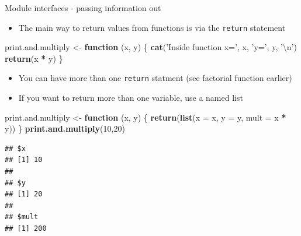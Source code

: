 \documentclass[ignorenonframetext,]{beamer}
\newenvironment{Shaded}{\begin{snugshade}}{\end{snugshade}}
\newcommand{\KeywordTok}[1]{\textcolor[rgb]{0.13,0.29,0.53}{\textbf{#1}}}
\newcommand{\DataTypeTok}[1]{\textcolor[rgb]{0.13,0.29,0.53}{#1}}
\newcommand{\DecValTok}[1]{\textcolor[rgb]{0.00,0.00,0.81}{#1}}
\newcommand{\CharTok}[1]{\textcolor[rgb]{0.31,0.60,0.02}{#1}}
\newcommand{\StringTok}[1]{\textcolor[rgb]{0.31,0.60,0.02}{#1}}
\newcommand{\ControlFlowTok}[1]{\textcolor[rgb]{0.13,0.29,0.53}{\textbf{#1}}}
\newcommand{\OperatorTok}[1]{\textcolor[rgb]{0.81,0.36,0.00}{\textbf{#1}}}
\newcommand{\NormalTok}[1]{#1}
\providecommand{\tightlist}{%
  \setlength{\itemsep}{0pt}\setlength{\parskip}{0pt}}
\begin{document}
\begin{frame}[fragile]{Module interfaces - passing information out}

\begin{itemize}[<+->]
\tightlist
\item
  The main way to return values from functions is via the
  \texttt{return} statement
\end{itemize}

\begin{Shaded}
\begin{Highlighting}[]
\NormalTok{print.and.multiply <-}\StringTok{ }\ControlFlowTok{function}\NormalTok{ (x, y) \{}
    \KeywordTok{cat}\NormalTok{(}\StringTok{'Inside function x='}\NormalTok{, x, }\StringTok{'y='}\NormalTok{, y, }\StringTok{'}\CharTok{\textbackslash{}n}\StringTok{'}\NormalTok{)}
    \KeywordTok{return}\NormalTok{(x }\OperatorTok{*}\StringTok{ }\NormalTok{y)}
\NormalTok{\}}
\end{Highlighting}
\end{Shaded}

\begin{itemize}[<+->]
\tightlist
\item
  You can have more than one \texttt{return} statment (see factorial
  function earlier)
\end{itemize}

\end{frame}

\begin{frame}[fragile]

\begin{itemize}[<+->]
\tightlist
\item
  If you want to return more than one variable, use a named list
\end{itemize}

\begin{Shaded}
\begin{Highlighting}[]
\NormalTok{print.and.multiply <-}\StringTok{ }\ControlFlowTok{function}\NormalTok{ (x, y) \{}
    \KeywordTok{return}\NormalTok{(}\KeywordTok{list}\NormalTok{(}\DataTypeTok{x =}\NormalTok{ x, }\DataTypeTok{y =}\NormalTok{ y, }\DataTypeTok{mult =}\NormalTok{ x }\OperatorTok{*}\StringTok{ }\NormalTok{y))}
\NormalTok{\}}
\KeywordTok{print.and.multiply}\NormalTok{(}\DecValTok{10}\NormalTok{,}\DecValTok{20}\NormalTok{)}
\end{Highlighting}
\end{Shaded}

\begin{verbatim}
## $x
## [1] 10
## 
## $y
## [1] 20
## 
## $mult
## [1] 200
\end{verbatim}

\end{frame}
\end{document}
